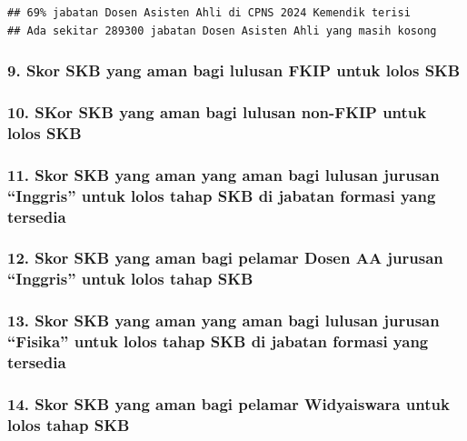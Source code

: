 \documentclass[
]{article}
\begin{document}
\begin{verbatim}
## 69% jabatan Dosen Asisten Ahli di CPNS 2024 Kemendik terisi
## Ada sekitar 289300 jabatan Dosen Asisten Ahli yang masih kosong
\end{verbatim}

\subsubsection{9. Skor SKB yang aman bagi lulusan FKIP untuk lolos
SKB}\label{skor-skb-yang-aman-bagi-lulusan-fkip-untuk-lolos-skb}

\subsubsection{10. SKor SKB yang aman bagi lulusan non-FKIP untuk lolos
SKB}\label{skor-skb-yang-aman-bagi-lulusan-non-fkip-untuk-lolos-skb}

\subsubsection{11. Skor SKB yang aman yang aman bagi lulusan jurusan
``Inggris'' untuk lolos tahap SKB di jabatan formasi yang
tersedia}\label{skor-skb-yang-aman-yang-aman-bagi-lulusan-jurusan-inggris-untuk-lolos-tahap-skb-di-jabatan-formasi-yang-tersedia}

\subsubsection{12. Skor SKB yang aman bagi pelamar Dosen AA jurusan
``Inggris'' untuk lolos tahap
SKB}\label{skor-skb-yang-aman-bagi-pelamar-dosen-aa-jurusan-inggris-untuk-lolos-tahap-skb}

\subsubsection{13. Skor SKB yang aman yang aman bagi lulusan jurusan
``Fisika'' untuk lolos tahap SKB di jabatan formasi yang
tersedia}\label{skor-skb-yang-aman-yang-aman-bagi-lulusan-jurusan-fisika-untuk-lolos-tahap-skb-di-jabatan-formasi-yang-tersedia}

\subsubsection{14. Skor SKB yang aman bagi pelamar Widyaiswara untuk
lolos tahap
SKB}\label{skor-skb-yang-aman-bagi-pelamar-widyaiswara-untuk-lolos-tahap-skb}
\end{document}
